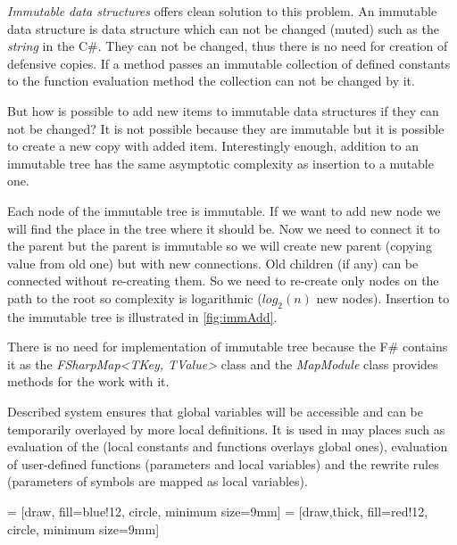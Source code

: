 \emph{Immutable data structures} offers clean solution to this problem.
An immutable data structure is data structure which can not be changed (muted) such as the \emph{string} in the C\#.
They can not be changed, thus there is no need for creation of defensive copies.
If a method passes an immutable collection of defined constants to the function evaluation method the collection can not be changed by it.

But how is possible to add new items to immutable data structures if they can not be changed?
It is not possible because they are immutable but it is possible to create a new copy with added item.
Interestingly enough, addition to an immutable tree has the same asymptotic complexity as insertion to a mutable one.

Each node of the immutable tree is immutable.
If we want to add new node we will find the place in the tree where it should be.
Now we need to connect it to the parent but the parent is immutable so we will create new parent (copying value from old one) but with new connections.
Old children (if any) can be connected without re-creating them.
So we need to re-create only nodes on the path to the root so complexity is logarithmic ($log_2(n)$ new nodes).
Insertion to the immutable tree is illustrated in \autoref{fig:immAdd}.

There is no need for implementation of immutable tree because the F\# contains it as the \emph{FSharpMap<TKey, TValue>} class and the \emph{MapModule} class provides methods for the work with it.

Described system ensures that global variables will be accessible and can be temporarily overlayed by more local definitions.
It is used in may places such as evaluation of the \lsystems (local constants and functions overlays global ones), evaluation of user-defined functions (parameters and local variables)
	and the rewrite rules (parameters of symbols are mapped as local variables).
	

 = [draw, fill=blue!12, circle, minimum size=9mm]
 = [draw,thick, fill=red!12, circle, minimum size=9mm]

